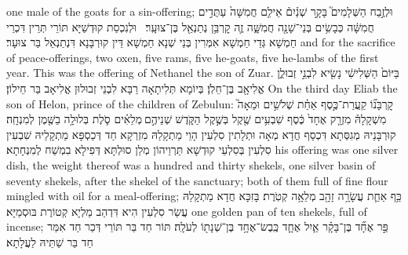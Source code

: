 {one male of the goats for a sin-offering;}{}
{וּלְזֶ֣בַח הַשְּׁלָמִים֮ בָּקָ֣ר שְׁנַ֒יִם֒ אֵילִ֤ם חֲמִשָּׁה֙ עַתֻּדִ֣ים חֲמִשָּׁ֔ה כְּבָשִׂ֥ים בְּנֵי־שָׁנָ֖ה חֲמִשָּׁ֑ה זֶ֛ה קׇרְבַּ֥ן נְתַנְאֵ֖ל בֶּן־צוּעָֽר׃ \petucha 
{}}
{וּלְנִכְסַת קוּדְשַׁיָּא תּוֹרֵי תְּרֵין דִּכְרֵי חַמְשָׁא גְּדֵי חַמְשָׁא אִמְּרִין בְּנֵי שְׁנָא חַמְשָׁא דֵּין קוּרְבָּנָא דִּנְתַנְאֵל בַּר צוּעָר׃}
{and for the sacrifice of peace-offerings, two oxen, five rams, five he-goats, five he-lambs of the first year. This was the offering of Nethanel the son of Zuar.}{}
{בַּיּוֹם֙ הַשְּׁלִישִׁ֔י נָשִׂ֖יא לִבְנֵ֣י זְבוּלֻ֑ן אֱלִיאָ֖ב בֶּן־חֵלֹֽן׃
}
{בְּיוֹמָא תְּלִיתָאָה רַבָּא לִבְנֵי זְבוּלוּן אֱלִיאָב בַּר חֵילוֹן׃}
{On the third day Eliab the son of Helon, prince of the children of Zebulun:}{}
{קׇרְבָּנ֞וֹ קַֽעֲרַת־כֶּ֣סֶף אַחַ֗ת שְׁלֹשִׁ֣ים וּמֵאָה֮ מִשְׁקָלָהּ֒ מִזְרָ֤ק אֶחָד֙ כֶּ֔סֶף שִׁבְעִ֥ים שֶׁ֖קֶל בְּשֶׁ֣קֶל הַקֹּ֑דֶשׁ שְׁנֵיהֶ֣ם \legarmeh  מְלֵאִ֗ים סֹ֛לֶת בְּלוּלָ֥ה בַשֶּׁ֖מֶן לְמִנְחָֽה׃}
{קוּרְבָּנֵיהּ מְגִסְּתָא דִּכְסַף חֲדָא מְאָה וּתְלָתִין סִלְעִין הָוֵי מַתְקָלַהּ מִזְרְקָא חַד דְּכַסְפָּא מַתְקָלֵיהּ שִׁבְעִין סִלְעִין בְּסִלְעֵי קוּדְשָׁא תַּרְוֵיהוֹן מְלַן סוּלְתָּא דְּפִילָא בִמְשַׁח לְמִנְחָתָא׃}
{his offering was one silver dish, the weight thereof was a hundred and thirty shekels, one silver basin of seventy shekels, after the shekel of the sanctuary; both of them full of fine flour mingled with oil for a meal-offering;}{}
{כַּ֥ף אַחַ֛ת עֲשָׂרָ֥ה זָהָ֖ב מְלֵאָ֥ה קְטֹֽרֶת׃}
{בָּזִכָּא חֲדָא מַתְקָלַהּ עֲשַׂר סִלְעִין הִיא דִּדְהַב מַלְיָא קְטוֹרֶת בּוּסְמַיָּא׃}
{one golden pan of ten shekels, full of incense;}{}
{פַּ֣ר אֶחָ֞ד בֶּן־בָּקָ֗ר אַ֧יִל אֶחָ֛ד כֶּֽבֶשׂ־אֶחָ֥ד בֶּן־שְׁנָת֖וֹ לְעֹלָֽה׃}
{תּוֹר חַד בַּר תּוֹרֵי דְּכַר חַד אִמַּר חַד בַּר שַׁתֵּיהּ לַעֲלָתָא׃}
